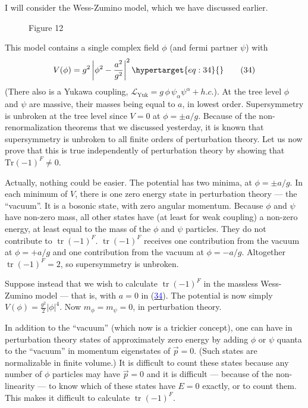 \documentclass[11pt,a4paper]{article}
\newcommand{\eqtarget}[1]{\hypertarget{eq:#1}{\mathstrut}\tag{#1}}
\newcommand{\eqnref}[1]{(\hyperlink{eq:#1}{\textcolor{blue}{#1}})}
\begin{document}
I will consider the Wess-Zumino model, which we have discussed
earlier.

\begin{figure}[h]
\centering

\par\smallskip
Figure 12
\end{figure}

This model contains a single complex field $\phi$ (and fermi
partner $\psi$) with
\begin{equation}
V(\phi) = g^2 \left|\phi^2 - \frac{a^2}{g^2}\right|^2
\eqtarget{34}
\end{equation}
(There also is a Yukawa coupling, $\mathcal{L}_{\mathrm{Yuk}} = g\, \phi\, \psi_\alpha \psi^\alpha + h.c.$). At the
tree level $\phi$ and $\psi$ are massive, their masses being equal to $a$, in
lowest order. Supersymmetry is unbroken at the tree level since
$V = 0$ at $\phi = \pm a/g$. Because of the non-renormalization theorems that
we discussed yesterday, it is known that supersymmetry is unbroken
to all finite orders of perturbation theory. Let us now prove that
this is true independently of perturbation theory by showing that
$\mathrm{Tr}(-1)^F \neq 0$.

Actually, nothing could be easier. The potential has two minima,
at $\phi = \pm a/g$. In each minimum of $V$, there is one zero energy state in
perturbation theory --- the ``vacuum''. It is a bosonic state, with
zero angular momentum. Because $\phi$ and $\psi$ have non-zero mass, all
other states have (at least for weak coupling) a non-zero energy,
at least equal to the mass of the $\phi$ and $\psi$ particles. They do not
contribute to $\operatorname{tr}(-1)^F$. $\operatorname{tr}(-1)^F$ receives one contribution from the
vacuum at $\phi = +a/g$ and one contribution from the vacuum at $\phi = -a/g$.
Altogether $\operatorname{tr}(-1)^F = 2$, so supersymmetry is unbroken.

Suppose instead that we wish to calculate $\operatorname{tr}(-1)^F$ in the massless
Wess-Zumino model --- that is, with $a = 0$ in \eqnref{34}. The potential
is now simply $V(\phi) = \frac{g^2}{2} |\phi|^4$. Now $m_\phi = m_\psi = 0$, in perturbation theory.

In addition to the ``vacuum'' (which now is a trickier concept), one
can have in perturbation theory states of approximately zero energy
by adding $\phi$ or $\psi$ quanta to the ``vacuum'' in momentum eigenstates of
$\vec p = 0$. (Such states are normalizable in finite volume.) It is difficult
to count these states because any number of $\phi$ particles may
have $\vec p = 0$ and it is difficult --- because of the non-linearity ---
to know which of these states have $E = 0$ exactly, or to count them.
This makes it difficult to calculate $\operatorname{tr}(-1)^F$.
\end{document}
